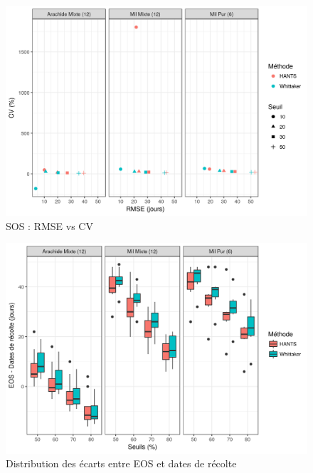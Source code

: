 \begin{figure}[htbp]
 \begin{center}
  \includegraphics[scale=0.8]{annexes/SOS_RMSE_vs_CV_Oracle.png} 
 \end{center}
 \caption*{SOS : RMSE vs CV}
\end{figure}

\begin{figure}[htbp]
 \begin{center}
  \includegraphics[scale=0.8]{annexes/EOS_Boxplot_Oracle.png} 
 \end{center}
 \caption*{Distribution des écarts entre EOS et dates de récolte}
\end{figure}


